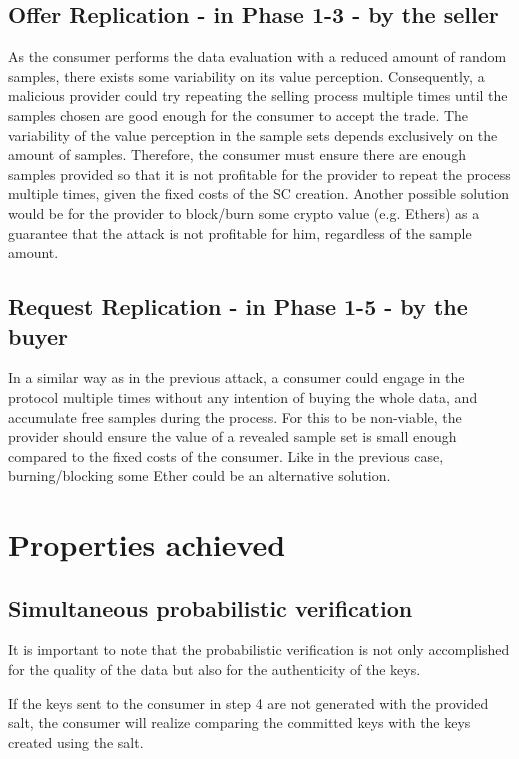 \documentclass[]{article}
\begin{document}
	\subsection{Offer Replication - in Phase 1-3 - by the seller} 
	As the consumer performs the data evaluation with a reduced amount of random samples, there exists some variability on its value perception. Consequently, a malicious provider could try repeating the selling process multiple times until the samples chosen are good enough for the consumer to accept the trade. The variability of the value perception in the sample sets depends exclusively on the amount of samples. Therefore, the consumer must ensure there are enough samples provided so that it is not profitable for the provider to repeat the process multiple times, given the fixed costs of the SC creation. Another possible solution would be for the provider to block/burn some crypto value (e.g. Ethers) as a guarantee that the attack is not profitable for him, regardless of the sample amount.
	
	\subsection{Request Replication - in Phase 1-5 - by the buyer}
	In a similar way as in the previous attack, a consumer could engage in the protocol multiple times without any intention of buying the whole data, and accumulate free samples during the process. For this to be non-viable, the provider should ensure the value of a revealed sample set is small enough compared to the fixed costs of the consumer. Like in the previous case, burning/blocking some Ether could be an alternative solution.
	
	
	\section{Properties achieved}
	\subsection {Simultaneous probabilistic verification}
	It is important to note that the probabilistic verification is not only accomplished for the quality of the data but also for the authenticity of the keys. 

	If the keys sent to the consumer in step 4 are not generated with the provided salt, the consumer will realize comparing the committed keys with the keys created using the salt. 
\end{document}
